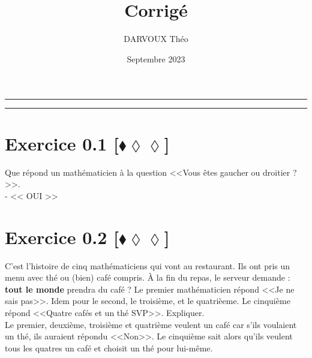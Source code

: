\documentclass[10pt]{article}
\title{\bf{\pagetitle}\\\large{Corrigé}}
\date{Septembre 2023}
\author{DARVOUX Théo}
\def\pagetitle{Logique}
\begin{document}
\renewcommand*\contentsname{Exercices.}
\renewcommand*{\cftsecleader}{\cftdotfill{\cftdotsep}}
\maketitle
\hrule
\tableofcontents
\vspace{0.5cm}
\hrule

\thispagestyle{fancy}
\fancyhead[C]{\pagetitle}



\section*{Exercice 0.1 [$\blacklozenge\lozenge\lozenge$]}
\begin{tcolorbox}[enhanced, width=6in, center, size=fbox, fontupper=\large, drop shadow southwest]
    Que répond un mathématicien à la question <<Vous êtes gaucher ou droitier ?>>.\\
    - << OUI >>
\end{tcolorbox}

\section*{Exercice 0.2 [$\blacklozenge\lozenge\lozenge$]}
\begin{tcolorbox}[enhanced, width=6in, center, size=fbox, fontupper=\large, drop shadow southwest]
    C'est l'histoire de cinq mathématiciens qui vont au restaurant. Ils ont pris un menu avec thé ou (bien) café compris. À la fin du repas, le serveur demande : \textbf{tout le monde} prendra du café ? Le premier mathématicien répond <<Je ne sais pas>>. Idem pour le second, le troisième, et le quatrièeme. Le cinquième répond <<Quatre cafés et un thé SVP>>. Expliquer.\\[0.5cm]
    Le premier, deuxième, troisième et quatrième veulent un café car s'ils voulaient un thé, ils auraient répondu <<Non>>. Le cinquième sait alors qu'ils veulent tous les quatres un café et choisit un thé pour lui-même. 
\end{tcolorbox}
\end{document}
